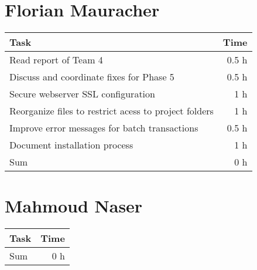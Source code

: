 \section*{Florian Mauracher}
\begin{table}[h!tpb]
  \centering
  \begin{tabularx}{\textwidth}{X r}
    \toprule
      Task & Time \\
    \midrule
      Read report of Team 4 & 0.5 h \\
      Discuss and coordinate fixes for Phase 5  & 0.5 h \\
      Secure webserver SSL configuration & 1 h \\
      Reorganize files to restrict acess to project folders & 1 h \\
      Improve error messages for batch transactions & 0.5 h \\
      Document installation process & 1 h \\
    \midrule
      Sum & 0 h \\
    \bottomrule
  \end{tabularx}
\end{table}

\clearpage
\section*{Mahmoud Naser}
\begin{table}[h!tpb]
  \centering
  \begin{tabularx}{\textwidth}{X r}
    \toprule
      Task & Time \\
    \midrule
    \midrule
      Sum & 0 h \\
    \bottomrule
  \end{tabularx}
\end{table}
